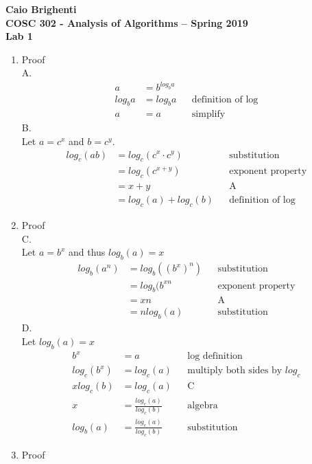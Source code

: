 \documentclass{article}
\begin{document}
\noindent \textbf{Caio Brighenti }\\
\noindent \textbf{COSC 302 - Analysis of Algorithms -- Spring 2019}\\%
\noindent \textbf{Lab 1}\vspace{1em}\\
\begin{enumerate}
	\item Proof \\ 
	A.
		\begin{align}
			a &= b^{log_ba} \\
			log_ba&=log_ba  && \text{definition of log}  \\
			a&=a && \text{simplify}
		\end{align}
	B. \\
		Let $a=c^x$ and $b=c^y$. 
		\begin{align}
			log_c(ab) &= log_c(c^x \cdot c^y) && \text{substitution}\\
			&= log_c(c^{x+y}) && \text{exponent property} \\
			&= x+y && \text{A}\\
			&= log_c(a)+log_c(b) && \text{definition of log}
		\end{align}
		\item Proof \\ 
	C. \\
	Let $a=b^x$ and thus $log_b(a)=x$
		\begin{align}
			log_b(a^n) &= log_b((b^x)^n) && \text{substitution}\\
			&= log_b(b^{xn} && \text{exponent property} \\
			&= xn && \text{A} \\
			&= nlog_b(a) && \text{substitution} 
		\end{align}
	D. \\ 
	Let $log_b(a)=x$
			\begin{align}
			b^x&=a && \text{log definition}\\
			log_c(b^x) &= log_c(a) && \text{multiply both sides by $log_c$} \\
	        xlog_c(b) &= log_c(a) && \text{C} \\
	        x &= \frac{log_c(a)}{log_c(b)} && \text{algebra} \\
	        log_b(a) &= \frac{log_c(a)}{log_c(b)} && \text{substitution} 
		\end{align}
	\item Proof \\ 

\end{enumerate}
\end{document}
